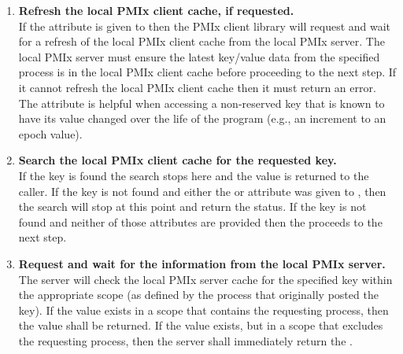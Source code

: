 \begin{enumerate}

    \item \textbf{Refresh the local \ac{PMIx} client cache, if requested.}\\
    If the  attribute is given to 
    then the \ac{PMIx} client library will request and wait for a refresh of the local
    \ac{PMIx} client cache from the local \ac{PMIx} server. The local \ac{PMIx} server
    must ensure the latest key/value data from the specified process is in the local
    \ac{PMIx} client cache before proceeding to the next step. If it cannot refresh
    the local \ac{PMIx} client cache then it must return an error.
    The  attribute is helpful when accessing a
    non-reserved key that is known to have its value changed over the life of the
    program (e.g., an increment to an epoch value).

    \item \textbf{Search the local \ac{PMIx} client cache for the requested key.}\\
    If the key is found the search stops here and the value is returned to the caller.
    If the key is not found and either the  or
     attribute was given to ,
    then the search will stop at this point and return the
     status. If the key is not found and neither of
    those attributes are provided then the  proceeds to the next step.

    \item \textbf{Request and wait for the information from the local \ac{PMIx} server.}\\
    The server will check the local \ac{PMIx} server cache for the specified key
    within the appropriate scope (as defined by the process that originally posted
    the key). If the value exists in a scope that contains the requesting process,
    then the value shall be returned. If the value exists, but in a scope that
    excludes the requesting process, then the server shall immediately return the
    .


\end{enumerate}
